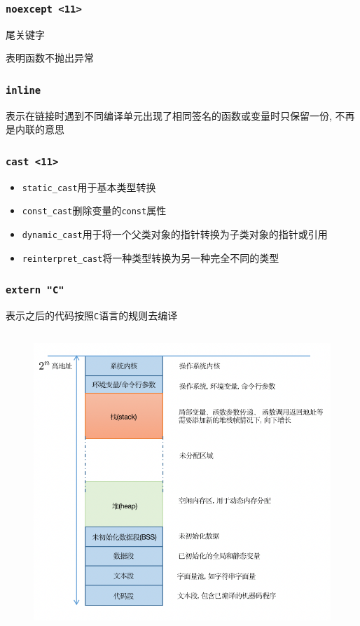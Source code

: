 \subsubsection{\tt noexcept <11>}
尾关键字

表明函数不抛出异常
\subsubsection{\tt inline}
表示在链接时遇到不同编译单元出现了相同签名的函数或变量时只保留一份, 不再是内联的意思
\subsubsection{\tt cast <11>}
\begin{itemize}
	\item {\tt static\_cast}用于基本类型转换
	\item {\tt const\_cast}删除变量的{\tt const}属性
	\item {\tt dynamic\_cast}用于将一个父类对象的指针转换为子类对象的指针或引用
	\item {\tt reinterpret\_cast}将一种类型转换为另一种完全不同的类型
\end{itemize}

\subsubsection{\tt extern "C"}
表示之后的代码按照{\tt C}语言的规则去编译

\subsection{\color{purple}{内存布局}}
\begin{figure}[htbp]
	\centering
	\includegraphics[scale=0.7]{tex_include/pic_include/cpp_basic_memo.png}
\end{figure}

